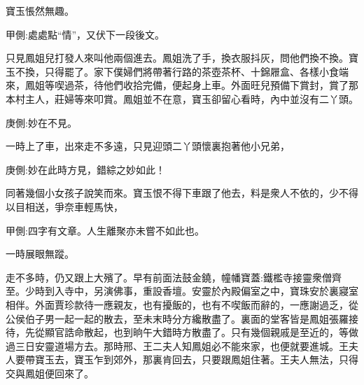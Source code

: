 \begin{parag}
    寶玉悵然無趣。\begin{note}甲側:處處點“情”，又伏下一段後文。\end{note}只見鳳姐兒打發人來叫他兩個進去。鳳姐洗了手，換衣服抖灰，問他們換不換。寶玉不換，只得罷了。家下僕婦們將帶著行路的茶壺茶杯、十錦屜盒、各樣小食端來，鳳姐等喫過茶，待他們收拾完備，便起身上車。外面旺兒預備下賞封，賞了那本村主人，莊婦等來叩賞。鳳姐並不在意，寶玉卻留心看時，內中並沒有二丫頭。\begin{note}庚側:妙在不見。\end{note}一時上了車，出來走不多遠，只見迎頭二丫頭懷裏抱著他小兄弟，\begin{note}庚側:妙在此時方見，錯綜之妙如此！\end{note}同著幾個小女孩子說笑而來。寶玉恨不得下車跟了他去，料是衆人不依的，少不得以目相送，爭奈車輕馬快，\begin{note}甲側:四字有文章。人生離聚亦未嘗不如此也。\end{note}一時展眼無蹤。
\end{parag}


\begin{parag}
    走不多時，仍又跟上大殯了。早有前面法鼓金鐃，幢幡寶蓋:鐵檻寺接靈衆僧齊至。少時到入寺中，另演佛事，重設香壇。安靈於內殿偏室之中，寶珠安於裏寢室相伴。外面賈珍款待一應親友，也有擾飯的，也有不喫飯而辭的，一應謝過乏，從公侯伯子男一起一起的散去，至未末時分方纔散盡了。裏面的堂客皆是鳳姐張羅接待，先從顯官誥命散起，也到晌午大錯時方散盡了。只有幾個親戚是至近的，等做過三日安靈道場方去。那時邢、王二夫人知鳳姐必不能來家，也便就要進城。王夫人要帶寶玉去，寶玉乍到郊外，那裏肯回去，只要跟鳳姐住著。王夫人無法，只得交與鳳姐便回來了。
\end{parag}


